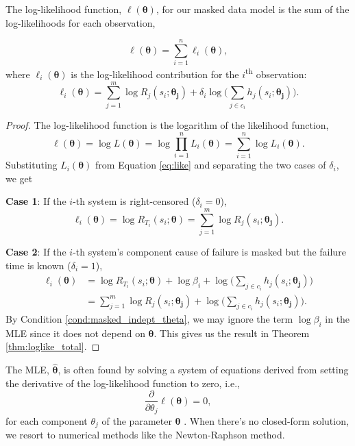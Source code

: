 \documentclass[
]{article}
\begin{document}
\begin{theorem}
\label{thm:loglike_total}
The log-likelihood function, $\ell(\boldsymbol{\theta})$, for our masked data model is the sum of the log-likelihoods for each observation,

\begin{equation}
\label{eq:loglike}
\ell(\boldsymbol{\theta}) = \sum_{i=1}^n \ell_i(\boldsymbol{\theta}),
\end{equation}
where $\ell_i(\boldsymbol{\theta})$ is the log-likelihood contribution for the $i$\textsuperscript{th} observation:
\begin{equation}
\ell_i(\boldsymbol{\theta}) = \sum_{j=1}^m \log R_j(s_i;\boldsymbol{\theta_j}) +
    \delta_i \log \bigl(\sum_{j\in c_i} h_j(s_i;\boldsymbol{\theta_j}) \bigr).
\end{equation}
\end{theorem}
\begin{proof}
The log-likelihood function is the logarithm of the likelihood function,
$$
\ell(\boldsymbol{\theta}) = \log L(\boldsymbol{\theta}) = \log \prod_{i=1}^n L_i(\boldsymbol{\theta}) = \sum_{i=1}^n \log L_i(\boldsymbol{\theta}).
$$
Substituting $L_i(\boldsymbol{\theta})$ from Equation \eqref{eq:like} and separating the two cases of $\delta_i$, we get

\textbf{Case 1}: If the $i$-th system is right-censored ($\delta_i = 0$),
$$
\ell_i(\boldsymbol{\theta}) = \log R_{T_i}(s_i;\boldsymbol{\theta}) = \sum_{j=1}^m \log R_j(s_i;\boldsymbol{\theta_j}).
$$

\textbf{Case 2}: If the $i$-th system's component cause of failure is masked but the failure time is known ($\delta_i = 1$),
\begin{align*}
\ell_i(\boldsymbol{\theta})
    &= \log R_{T_i}(s_i;\boldsymbol{\theta}) + \log \beta_i + \log \bigl(\sum_{j\in c_i} h_j(s_i;\boldsymbol{\theta_j})\bigr) \\
    &= \sum_{j=1}^m \log R_j(s_i;\boldsymbol{\theta_j}) + \log \bigl(\sum_{j\in c_i} h_j(s_i;\boldsymbol{\theta_j}) \biggr).
\end{align*}
By Condition \ref{cond:masked_indept_theta}, we may ignore the term $\log \beta_i$ in the MLE since it does not
depend on $\boldsymbol{\theta}$. This gives us the result in Theorem \ref{thm:loglike_total}.
\end{proof}

The MLE, \(\hat{\boldsymbol{\theta}}\), is often found by solving a
system of equations derived from setting the derivative of the
log-likelihood function to zero, i.e., \begin{equation}
\label{eq:mle_eq}
\frac{\partial}{\partial \theta_j} \ell(\boldsymbol{\theta}) = 0,
\end{equation} for each component \(\theta_j\) of the parameter
\(\boldsymbol{\theta}\) \citep{bain}. When there's no closed-form
solution, we resort to numerical methods like the Newton-Raphson method.
\end{document}
